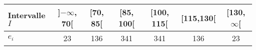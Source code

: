 \documentclass{standalone}
\begin{document}
\begin{tabular}{l|c|c|c|c|c|c}
	Intervalle $I$ &  ]$-\infty$, 70[ & [70, 85[ & [85, 100[ & [100, 115[ & [115,130[ & [130, $\infty$[\\
	\hline 
	$e_i$            & 23    & 136    & 341     & 341      & 136       & 23
\end{tabular}
\end{document}
